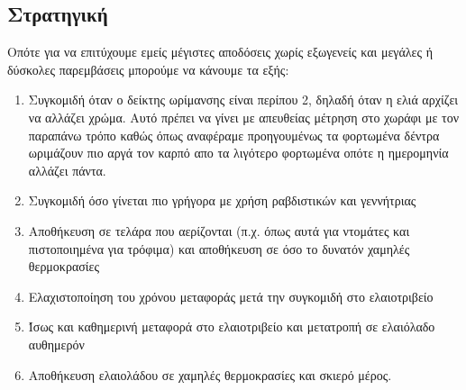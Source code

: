 \documentclass[12pt,a4paper]{article}
\begin{document}
\subsection*{Στρατηγική}
Οπότε για να επιτύχουμε εμείς μέγιστες αποδόσεις χωρίς εξωγενείς και μεγάλες ή δύσκολες παρεμβάσεις μπορούμε να κάνουμε τα εξής:
\begin{enumerate}
	\item Συγκομιδή όταν ο δείκτης ωρίμανσης είναι περίπου 2, δηλαδή όταν η ελιά αρχίζει να αλλάζει χρώμα. Αυτό πρέπει να γίνει με απευθείας μέτρηση στο χωράφι με τον παραπάνω τρόπο καθώς όπως αναφέραμε προηγουμένως τα φορτωμένα δέντρα ωριμάζουν πιο αργά τον καρπό απο τα λιγότερο φορτωμένα οπότε η ημερομηνία αλλάζει πάντα. \
	\item Συγκομιδή όσο γίνεται πιο γρήγορα με χρήση ραβδιστικών και γεννήτριας \
	\item Αποθήκευση σε τελάρα που αερίζονται (π.χ. όπως αυτά για ντομάτες και πιστοποιημένα για τρόφιμα) και αποθήκευση σε όσο το δυνατόν χαμηλές θερμοκρασίες\
	\item Ελαχιστοποίηση του χρόνου μεταφοράς μετά την συγκομιδή στο ελαιοτριβείο\
	\item Ίσως και καθημερινή μεταφορά στο ελαιοτριβείο και μετατροπή σε ελαιόλαδο αυθημερόν\ 
	\item  Αποθήκευση ελαιολάδου σε χαμηλές θερμοκρασίες και σκιερό μέρος.
\end{enumerate}
  
\end{document}
